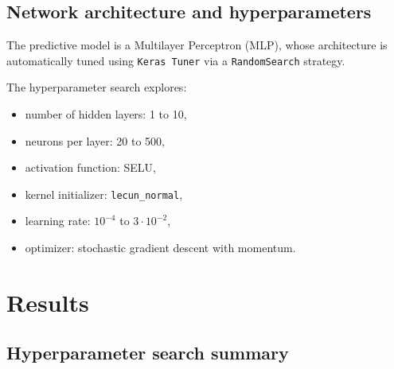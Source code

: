 \documentclass{article}
\begin{document}
\subsection{Network architecture and hyperparameters}

The predictive model is a Multilayer Perceptron (MLP), whose architecture is 
automatically tuned using \texttt{Keras Tuner} via a \texttt{RandomSearch} strategy. 

The hyperparameter search explores:
\begin{itemize}
    \item number of hidden layers: 1 to 10,
    \item neurons per layer: 20 to 500,
    \item activation function: SELU,
    \item kernel initializer: \texttt{lecun\_normal},
    \item learning rate: \(10^{-4}\) to \(3 \cdot 10^{-2}\),
    \item optimizer: stochastic gradient descent with momentum.
\end{itemize}

\section{Results}

\subsection{Hyperparameter search summary}
\end{document}
